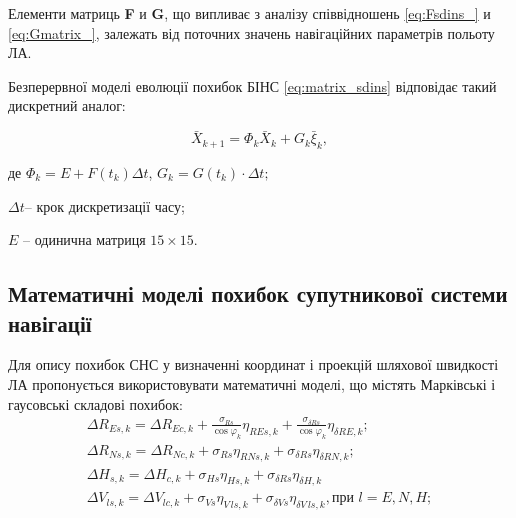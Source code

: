 Елементи матриць \textbf{F} и \textbf{G}, що випливає з аналізу співвідношень \eqref{eq:Fsdins_} 
и \eqref{eq:Gmatrix_}, залежать від поточних значень навігаційних параметрів польоту 
ЛА.

Безперервної моделі еволюції похибок БІНС  \eqref{eq:matrix_sdins} відповідає такий 
дискретний аналог:

\[\bar{X}_{k+1} =\Phi_{k} \bar{X}_{k} +G_{k} \bar{\xi}_{k} ,\] 
\begin{ESKDexplanation}
\item де $\Phi_{k}=E+F(t_{k})\Delta t$, $G_{k} =G(t_{k})\cdot \Delta t;$ 
\item $\Delta t$--  крок дискретизації часу;
\item $E$ -- одинична матриця  $15\times 15$.
\end{ESKDexplanation}

\subsection{Математичні моделі похибок супутникової системи навігації}

Для опису  похибок СНС у визначенні координат і проекцій шляхової швидкості ЛА пропонується 
використовувати математичні моделі, що містять  Марківські і гаусовські складові 
похибок:
\begin{equation} \label{eq:sns_errors} 
\begin{array}{l} 
{\Delta R_{Es,k} =\Delta R_{Ec,k} +\frac{\sigma_{Rs} }{\cos \varphi_{k} } \eta_{REs,k} +\frac{\sigma_{\delta Rs} }{\cos \varphi_{k} } \eta_{\delta RE,k} ;} \\ 
{\Delta R_{Ns,k} =\Delta R_{Nc,k} +\sigma_{Rs} \eta_{RNs,k} +\sigma_{\delta Rs} \eta_{\delta RN,k} ;} \\ 
{\Delta H_{s,k} =\Delta H_{c,k} +\sigma_{Hs} \eta_{Hs,k} +\sigma_{\delta Rs} \eta_{\delta H,k} }\\ 
{\Delta V_{ls,k} =\Delta V_{lc,k} +\sigma_{Vs} \eta_{V\, ls,k} +\sigma_{\delta Vs} \eta_{\delta V\, ls,k}, \text{при } l=E,N,H;} 
\end{array} \end{equation} 

